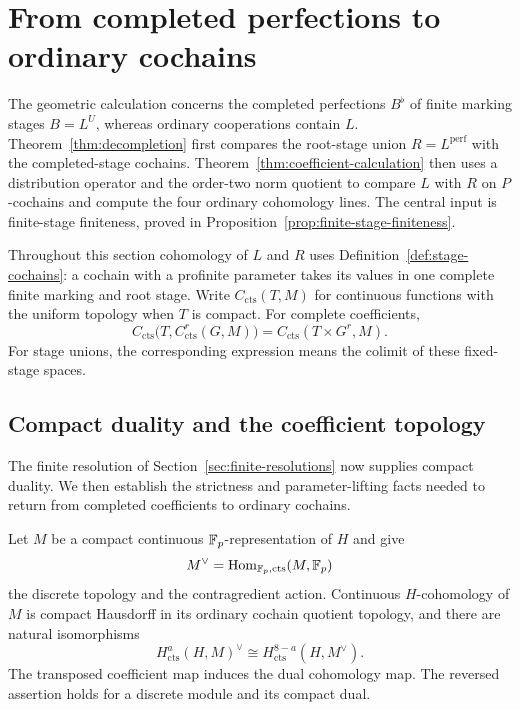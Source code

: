 \section{From completed perfections to ordinary cochains}
\label{sec:decompletion}

The geometric calculation concerns the completed perfections \(B^\flat\)
of finite marking stages \(B=L^U\), whereas ordinary cooperations contain
\(L\). Theorem~\ref{thm:decompletion} first compares the root-stage union
\(R=L^{\mathrm{perf}}\) with the completed-stage cochains.
Theorem~\ref{thm:coefficient-calculation} then uses a distribution operator
and the order-two norm quotient to compare \(L\) with \(R\) on
\(P\)-cochains and compute the four ordinary cohomology lines. The central
input is finite-stage finiteness, proved in
Proposition~\ref{prop:finite-stage-finiteness}.

Throughout this section cohomology of \(L\) and \(R\) uses
Definition~\ref{def:stage-cochains}: a cochain with a profinite parameter
takes its values in one complete finite marking and root stage. Write
\(C_{\mathrm{cts}}(T,M)\) for continuous functions with the uniform topology
when \(T\) is compact. For complete coefficients,
\[
 C_{\mathrm{cts}}\bigl(T,C^r_{\mathrm{cts}}(G,M)\bigr)
 =C_{\mathrm{cts}}(T\times G^r,M).
\]
For stage unions, the corresponding expression means the colimit of these
fixed-stage spaces.

\subsection{Compact duality and the coefficient topology}

The finite resolution of Section~\ref{sec:finite-resolutions} now supplies
compact duality. We then establish the strictness and parameter-lifting
facts needed to return from completed coefficients to ordinary cochains.

\begin{lemma}
\label{lem:compact-duality}
Let $M$ be a compact continuous $\mathbb F_p$-representation of $H$ and give
\[
 M^\vee=\operatorname{Hom}_{\mathbb F_p,\mathrm{cts}}(M,\mathbb F_p)
\]
the discrete topology and the contragredient action.  Continuous
$H$-cohomology of $M$ is compact Hausdorff in its ordinary cochain
quotient topology, and there are natural isomorphisms
\begin{equation}
 \label{eq:compact-cohomology-duality}
 H^a_{\mathrm{cts}}(H,M)^\vee
 \cong H^{8-a}_{\mathrm{cts}}(H,M^\vee).
\end{equation}
The transposed coefficient map induces the dual cohomology map.
The reversed assertion holds for a discrete module and its compact
dual.
\end{lemma}


